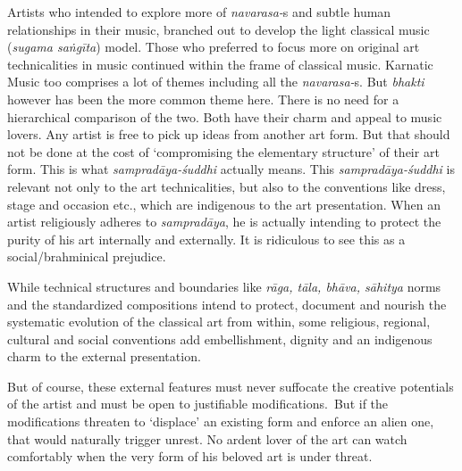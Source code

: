 Artists who intended to explore more of \textit{navarasa-}s and subtle human relationships in their music, branched out to develop the light classical music (\textit{sugama saṅgīta}) model. Those who preferred to focus more on original art technicalities in music continued within the frame of classical music. Karnatic Music too comprises a lot of themes including all the \textit{navarasa-}s. But \textit{bhakti} however has been the more common theme here. There is no need for a hierarchical comparison of the two. Both have their charm and appeal to music lovers. Any artist is free to pick up ideas from another art form. But that should not be done at the cost of ‘compromising the elementary structure’ of their art form. This is what \textit{sampradāya-śuddhi} actually means. This \textit{sampradāya-śuddhi} is relevant not only to the art technicalities, but also to the conventions like dress, stage and occasion etc., which are indigenous to the art presentation. When an artist religiously adheres to \textit{sampradāya}, he is actually intending to protect the purity of his art internally and externally. It is ridiculous to see this as a social/brahminical prejudice.

While technical structures and boundaries like \textit{rāga, tāla, bhāva, sāhitya} norms and the standardized compositions intend to protect, document and nourish the systematic evolution of the classical art from within, some religious, regional, cultural and social conventions add embellishment, dignity and an indigenous charm to the external presentation.

But of course, these external features must never suffocate the creative potentials of the artist and must be open to justifiable modifications.~But if the modifications threaten to ‘displace’ an existing form and enforce an alien one, that would naturally trigger unrest. No ardent lover of the art can watch comfortably when the very form of his beloved art is under threat.

